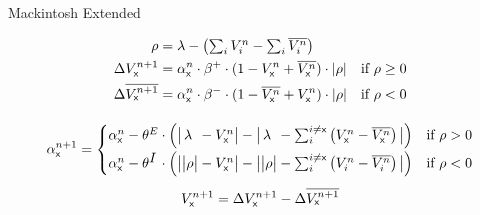 \documentclass[varwidth]{standalone}
\begin{document}
\newcommand{\eks}{\textsf{x}}
\newcommand{\longlambda}{\rlap{$\,\lambda$}\phantom{\big| \rho \big|}}
\newcommand{\longI}{\rlap{$I$}\phantom{E}}

\begin{center}
	\huge
	\sffamily
	Mackintosh Extended
\end{center}

\begin{gather*}
	\begin{aligned}
		\rho &= \lambda - \left( \textstyle\sum_i V_i^n - \textstyle\sum_i \overline{V_i^n} \right) \\
		\Delta V_\eks^{n + 1} &= \alpha_\eks^n \cdot \beta^+ \cdot (1 - V_\eks^n + \overline{V_\eks^n}) \cdot \left| \rho \right| & \text{if } \rho \geq 0 \\
		 \Delta \overline{V_\eks^{n + 1}} &= \alpha_\eks^n \cdot \beta^- \cdot (1 - \overline{V_\eks^n} + V_\eks^n) \cdot \left| \rho \right| & \text{if } \rho < 0
	\end{aligned} \\[1em]
	\begin{gathered}
		\alpha_\eks^{n + 1} =
			\begin{cases}
				\alpha^n_\eks -\theta^E \cdot \left( \big| \longlambda - V_\eks^n \big| - \big| \longlambda - \textstyle\sum_i^{i \neq \eks} \left( V_\eks^n - \overline{V_\eks^n} \right) \big| \right) & \text{if } \rho > 0 \\[1ex]
				 \alpha^n_\eks -\theta^{\longI} \cdot \left( \big| \big| \rho \big| - V_\eks^n \big| - \big| \big| \rho \big| - \textstyle\sum_i^{i \neq \eks} \left( V_i^n - \overline{V_i^n} \right) \big| \right) & \text{if } \rho < 0
			\end{cases} \\[1ex]
			V_\eks^{n + 1} = \Delta V_\eks^{n + 1} - \Delta \overline{V_\eks^{n + 1}}
	\end{gathered}
\end{gather*}
\end{document}
